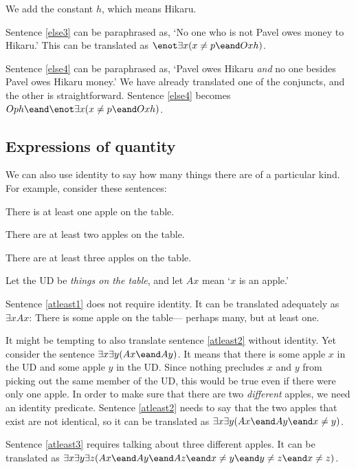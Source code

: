 

We add the constant $h$, which means Hikaru.

Sentence \ref{else3} can be paraphrased as, `No one who is not Pavel owes money to Hikaru.' This can be translated as $\enot\exists x(x\neq p \eand Oxh)$.

Sentence \ref{else4} can be paraphrased as, `Pavel owes Hikaru \emph{and} no one besides Pavel owes Hikaru money.' We have already translated one of the conjuncts, and the other is straightforward. Sentence \ref{else4} becomes $Oph \eand \enot\exists x(x\neq p \eand Oxh)$.


\subsection{Expressions of quantity}
We can also use identity to say how many things there are of a particular kind. For example, consider these sentences:
\begin{earg}
\item[\ex{atleast1}] There is at least one apple on the table.
\item[\ex{atleast2}] There are at least two apples on the table.
\item[\ex{atleast3}] There are at least three apples on the table.
\end{earg}
Let the UD be \emph{things on the table}, and let $Ax$ mean `$x$ is an apple.'

Sentence \ref{atleast1} does not require identity. It can be translated adequately as $\exists x Ax$: There is some apple on the table--- perhaps many, but at least one.

It might be tempting to also translate sentence \ref{atleast2} without identity. Yet consider the sentence $\exists x \exists y(Ax \eand Ay)$. It means that there is some apple $x$ in the UD and some apple $y$ in the UD. Since nothing precludes $x$ and $y$ from picking out the same member of the UD, this would be true even if there were only one apple. In order to make sure that there are two \emph{different} apples, we need an identity predicate. Sentence \ref{atleast2} needs to say that the two apples that exist are not identical, so it can be translated as $\exists x \exists y(Ax \eand Ay \eand x\neq y)$.

Sentence \ref{atleast3} requires talking about three different apples. It can be translated as $\exists x \exists y\exists z(Ax \eand Ay \eand Az \eand x\neq y \eand y\neq z \eand x \neq z)$.


